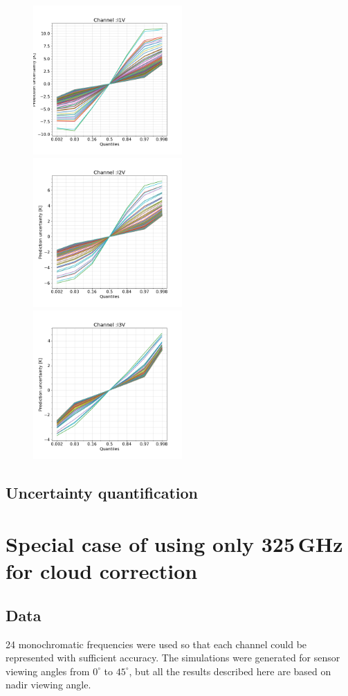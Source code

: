 \documentclass[amt, manuscript]{copernicus}
\begin{document}
\begin{figure}[p]
	\centering
	\includegraphics[height=57mm]{Figures/prediction_uncertainty_I1V.png} 
	\includegraphics[height=57mm]{Figures/prediction_uncertainty_I2V.png}
	\includegraphics[height=57mm]{Figures/prediction_uncertainty_I3V.png} 
	\caption{}
	\label{fig:}	
\end{figure}
\subsection{Uncertainty quantification}


\section{Special case of using only 325\,GHz for cloud correction}

\subsection{Data}
24 monochromatic frequencies were used so that each channel could be represented
with sufficient accuracy. The simulations were generated for sensor viewing angles from
$0^{\circ}$ to $45^{\circ}$, but all the results described here are based on nadir viewing angle.
\end{document}
